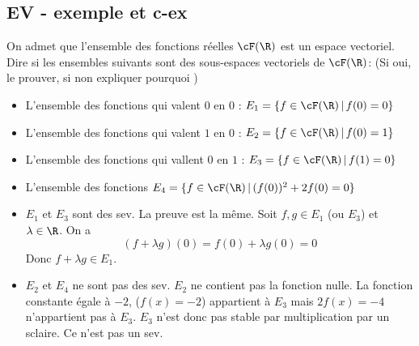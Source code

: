\subsection{EV - exemple et c-ex}

\begin{exercice}
On admet que l'ensemble des fonctions réelles $\cF(\R)$ est un espace vectoriel. 
Dire si les ensembles suivants sont des sous-espaces vectoriels de $\cF(\R)$: 
(Si oui, le prouver, si non expliquer pourquoi )
\begin{itemize}
\item L'ensemble des fonctions qui valent $0$ en $0$ : $E_1 = \{ f \in  \cF(\R)\, |\, f(0)=0 \}$ 
\item L'ensemble des fonctions qui valent $1$ en $0$ : $E_2 = \{ f \in  \cF(\R)\, |\, f(0)=1 \}$ 
\item L'ensemble des fonctions qui vallent $0$ en $1$ : $E_3 = \{ f \in  \cF(\R)\, |\, f(1)=0 \}$
\item L'ensemble des fonctions $E_4 = \{ f \in  \cF(\R)\, |\, (f(0))^2 +2f(0)=0 \}$
\end{itemize}


\end{exercice}
\begin{correction}
\begin{itemize}
\item $E_1$  et $E_3$ sont des  sev. La preuve est la même. Soit $f, g\in E_1 $ (ou $E_3$) et $\lambda\in \R$. On a 
$$(f+\lambda g) (0)  = f(0)+\lambda g(0) = 0$$
Donc $f+\lambda g \in E_1$. 
\item $E_2$ et $E_4$ ne sont pas des sev.  $E_2$ ne contient pas la fonction nulle. 
La fonction constante égale à $-2$, ($f(x) =-2$) appartient à  $E_3$  mais $2f(x) =-4$ n'appartient pas à $E_3$. $E_3$ n'est donc pas stable par multiplication par un sclaire. Ce n'est pas un sev.  

\end{itemize}
\end{correction}







